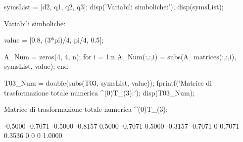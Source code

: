 \documentclass[11pt, a4paper]{article}
\begin{document}
\begin{matlabcode}
symsList = [d2, q1, q2, q3];
disp('Variabili simboliche:');
disp(symsList);
\end{matlabcode}
\begin{matlaboutput}
Variabili simboliche:
\end{matlaboutput}
\newpage
\begin{matlabcode}
value = [0.8, (3*pi)/4, pi/4, 0.5];

A_Num = zeros(4, 4, n);
for i = 1:n
    A_Num(:,:,i) = subs(A_matrices(:,:,i), symsList, value);
end

T03_Num = double(subs(T03, symsList, value));
fprintf('Matrice di trasformazione totale numerica ^(0)T_(3):\n');
disp(T03_Num);
\end{matlabcode}
\begin{matlaboutput}
Matrice di trasformazione totale numerica ^(0)T_(3):
\end{matlaboutput}
\begin{matlaboutput}
   -0.5000   -0.7071   -0.5000   -0.8157
    0.5000   -0.7071    0.5000   -0.3157
   -0.7071         0    0.7071    0.3536
         0         0         0    1.0000
\end{matlaboutput}

\end{document}
